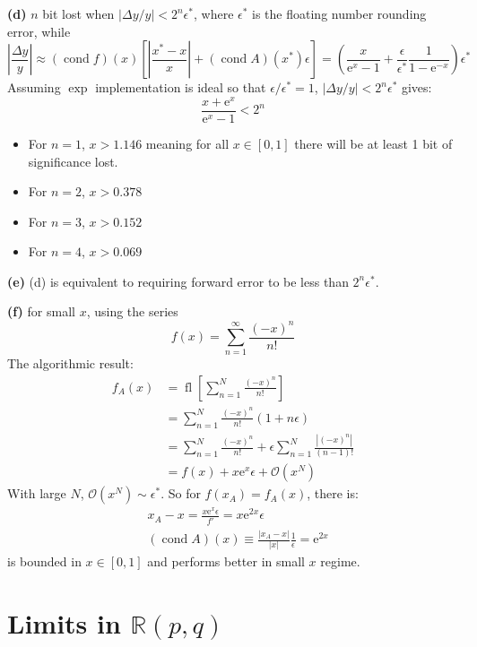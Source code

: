 \documentclass[11pt]{article}
\numberwithin{equation}{section} %
\newcommand\e{\mathrm{e}}
\DeclareMathOperator{\fl}{fl}
\DeclareMathOperator{\cond}{cond}
\begin{document}
\textbf{(d)} $n$ bit lost when $|\Delta y / y| < 2^n \epsilon^*$, where 
$\epsilon^*$ is the floating number rounding error, while 
\begin{equation}
  \left|\frac{\Delta y}{y}\right| \approx 
  (\cond f)(x)\left[\left|\frac{x^* - x}{x}\right| + 
  (\cond A)(x^*)\epsilon\right]
  = \left(\frac{x}{\e^x-1} + \frac{\epsilon}{\epsilon^*}
    \frac{1}{1-\e^{-x}}\right)\epsilon^*
\end{equation}
Assuming $\exp$ implementation is ideal so that $\epsilon/\epsilon^* = 1$, 
$|\Delta y / y| < 2^n \epsilon^*$ gives:
\begin{equation}
  \frac{x+\e^{x}}{\e^x - 1} < 2^n
\end{equation}
\begin{itemize}
  \item For $n=1$, $x > 1.146$ meaning for all $x\in[0,1]$ there will be 
    at least 1 bit of significance lost. 
  \item For $n=2$, $x > 0.378$
  \item For $n=3$, $x > 0.152$
  \item For $n=4$, $x > 0.069$
\end{itemize}

\textbf{(e)} (d) is equivalent to requiring forward error to be 
less than $2^n\epsilon^*$. 

\textbf{(f)} for small $x$, using the series 
\begin{equation}
  f(x) = \sum_{n=1}^\infty \frac{(-x)^n}{n!}
\end{equation}
The algorithmic result:
\begin{align}
  f_A(x) &= \fl\left[\sum_{n=1}^N \frac{(-x)^n}{n!}\right] \\
         &= \sum_{n=1}^N\frac{(-x)^n}{n!}(1+n\epsilon) \\
         &= \sum_{n=1}^N\frac{(-x)^n}{n!} +
         \epsilon \sum_{n=1}^N\frac{|(-x)^n|}{(n-1)!} \\
         &= f(x) + x\e^x\epsilon + \mathcal O(x^N) 
\end{align}
With large $N$, $\mathcal O(x^N) \sim \epsilon^*$. So for $f(x_A) = f_A(x)$, 
there is: 
\begin{align}
  &x_A - x = \frac{x\e^x \epsilon}{f'} = x\e^{2x}\epsilon\\
  &(\cond A)(x) \equiv \frac{|x_A - x|}{|x|}\frac{1}{\epsilon} 
  = \e^{2x}
\end{align}
is bounded in $x\in [0,1]$ and performs better in small $x$ regime. 

\section{Limits in $\mathbb R(p,q)$}

\end{document}
